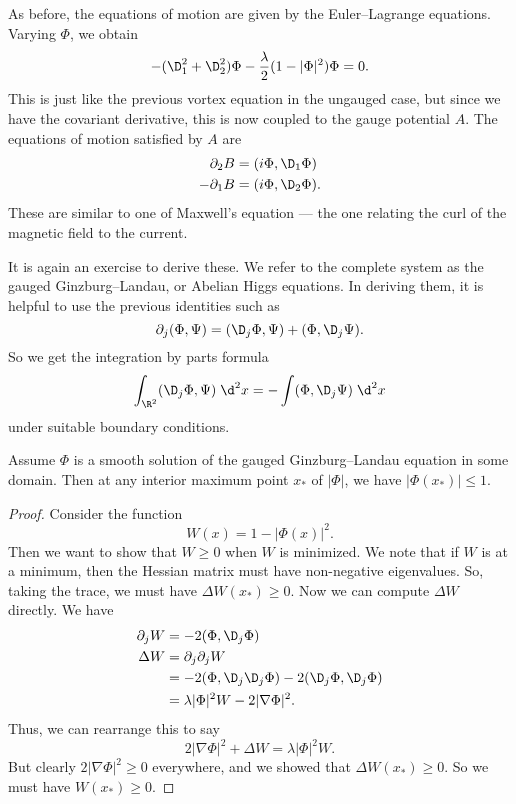 \documentclass[a4paper]{article}
\begin{document}
As before, the equations of motion are given by the Euler--Lagrange equations. Varying $\Phi$, we obtain
\[
  - (\D_1^2 + \D_2^2) \Phi - \frac{\lambda}{2} (1 - |\Phi|^2)\Phi = 0.
\]
This is just like the previous vortex equation in the ungauged case, but since we have the covariant derivative, this is now coupled to the gauge potential $A$. The equations of motion satisfied by $A$ are
\begin{align*}
  \partial_2 B &= (i \Phi, \D_1 \Phi)\\
  -\partial_1 B &= (i \Phi, \D_2 \Phi).
\end{align*}
These are similar to one of Maxwell's equation --- the one relating the curl of the magnetic field to the current.

It is again an exercise to derive these. We refer to the complete system as the gauged Ginzburg--Landau, or Abelian Higgs equations. In deriving them, it is helpful to use the previous identities such as
\[
  \partial_j (\Phi, \Psi) = (\D_j \Phi, \Psi) + (\Phi, \D_j \Psi).
\]
So we get the integration by parts formula
\[
  \int_{\R^2} (\D_j \Phi, \Psi)\;\d^2 x = - \int (\Phi, \D_j \Psi)\;\d^2 x
\]
under suitable boundary conditions.

\begin{lemma}
  Assume $\Phi$ is a smooth solution of the gauged Ginzburg--Landau equation in some domain. Then at any interior maximum point $x_*$ of $|\Phi|$, we have $|\Phi(x_*)| \leq 1$.
\end{lemma}

\begin{proof}
  Consider the function
  \[
    W(x) = 1 - |\Phi(x)|^2.
  \]
  Then we want to show that $W \geq 0$ when $W$ is minimized. We note that if $W$ is at a minimum, then the Hessian matrix must have non-negative eigenvalues. So, taking the trace, we must have $\Delta W(x_*) \geq 0$. Now we can compute $\Delta W$ directly. We have
  \begin{align*}
    \partial_j W &= -2 (\Phi, \D_j \Phi)\\
    \Delta W &= \partial_j \partial_j W \\
    &= - 2(\Phi, \D_j \D_j \Phi) - 2(\D_j \Phi, \D_j \Phi)\\
    &= \lambda |\Phi|^2 W - 2 |\nabla \Phi|^2.
  \end{align*}
  Thus, we can rearrange this to say
  \[
    2 |\nabla \Phi|^2 + \Delta W = \lambda |\Phi|^2 W.
  \]
  But clearly $2 |\nabla \Phi|^2 \geq 0$ everywhere, and we showed that $\Delta W(x_*) \geq 0$. So we must have $W(x_*) \geq 0$.
\end{proof}
\end{document}
